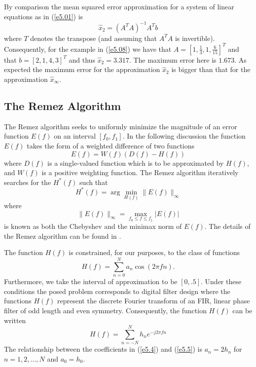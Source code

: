 	By comparison the mean squared error
approximation for a system of linear equations as in 
(\ref{e5.01}) is
%
\begin{equation}
\hat{x}_2=(A^TA)^{-1}A^Tb
\label{e5.09}
\end{equation}
%
where $T$ denotes the transpose  (and assuming that $A^TA$ is
invertible).  Consequently, for the example in (\ref{e5.08})
we have that $A=[1, \frac{1}{3}, 1, \frac{6}{15}]^T$ and
that $b=[2, 1, 4, 3]^T$ and thus $\hat{x}_2=3.317$.  The maximum 
error here is $1.673$.  As expected the maximum error for
the approximation $\hat{x}_2$ is bigger than that for the
approximation $\hat{x}_{\infty}$.

\subsection{The Remez Algorithm}


	The Remez algorithm seeks to uniformly minimize
the magnitude of an error function $E(f)$ on an interval $[f_0,f_1]$.
In the following discussion
the function $E(f)$ takes the form of a weighted difference of two functions
%
\begin{equation}
E(f)=W(f)(D(f)-H(f))
\label{e5.1}
\end{equation}
%
where $D(f)$ is a single-valued function
which is to be approximated by $H(f)$, and $W(f)$ is a 
positive weighting function.  The Remez algorithm iteratively searches 
for the $H^*(f)$ such that
%
\begin{equation}
H^*(f)=\arg \min_{H(f)}\|E(f)\|_{\infty}
\label{e5.2}
\end{equation}
%
where
%
\begin{equation}
\|E(f)\|_{\infty}=\max_{f_0\le f\le f_1}|E(f)|
\label{e5.3}
\end{equation}
%
is known as both the Chebyshev and the minimax norm of $E(f)$.
The details of the Remez algorithm can be found in \cite{cheney}.

	The function $H(f)$ is 
constrained, for our purposes, to the class of 
functions
%
\begin{equation}
H(f)=\sum_{n=0}^{N}a_n\cos(2\pi fn).
\label{e5.4}
\end{equation}
%
Furthermore, we take the interval of approximation to
be $[0,.5]$.  Under these conditions the posed problem
corresponds to digital filter design where the functions
$H(f)$ represent the discrete Fourier transform of an
FIR, linear phase filter of odd length and even symmetry.
Consequently, the function $H(f)$ can be written
%
\begin{equation}
H(f)=\sum_{n=-N}^{N}h_n e^{-j2\pi fn}
\label{e5.5}
\end{equation}
%
The relationship between the 
coefficients in (\ref{e5.4}) and (\ref{e5.5})
is $a_n=2h_n$ for $n=1,2,\ldots,N$ and $a_0=h_0$.

